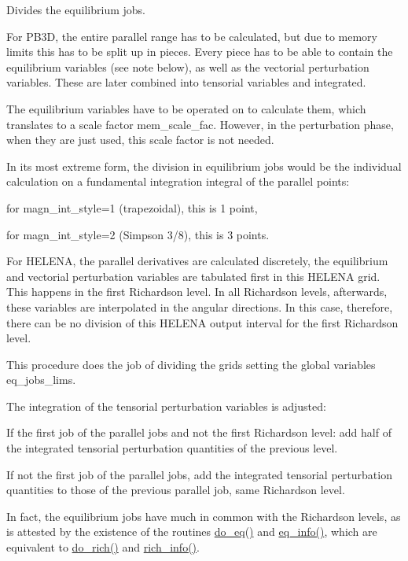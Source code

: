 Divides the equilibrium jobs. 

For P\+B3D, the entire parallel range has to be calculated, but due to memory limits this has to be split up in pieces. Every piece has to be able to contain the equilibrium variables (see note below), as well as the vectorial perturbation variables. These are later combined into tensorial variables and integrated.

The equilibrium variables have to be operated on to calculate them, which translates to a scale factor {\ttfamily mem\+\_\+scale\+\_\+fac}. However, in the perturbation phase, when they are just used, this scale factor is not needed.

In its most extreme form, the division in equilibrium jobs would be the individual calculation on a fundamental integration integral of the parallel points\+:
\begin{DoxyItemize}
\item for {\ttfamily magn\+\_\+int\+\_\+style=1} (trapezoidal), this is 1 point,
\item for {\ttfamily magn\+\_\+int\+\_\+style=2} (Simpson 3/8), this is 3 points.
\end{DoxyItemize}

For H\+E\+L\+E\+NA, the parallel derivatives are calculated discretely, the equilibrium and vectorial perturbation variables are tabulated first in this H\+E\+L\+E\+NA grid. This happens in the first Richardson level. In all Richardson levels, afterwards, these variables are interpolated in the angular directions. In this case, therefore, there can be no division of this H\+E\+L\+E\+NA output interval for the first Richardson level.

This procedure does the job of dividing the grids setting the global variables {\ttfamily eq\+\_\+jobs\+\_\+lims}.

The integration of the tensorial perturbation variables is adjusted\+:
\begin{DoxyItemize}
\item If the first job of the parallel jobs and not the first Richardson level\+: add half of the integrated tensorial perturbation quantities of the previous level.
\item If not the first job of the parallel jobs, add the integrated tensorial perturbation quantities to those of the previous parallel job, same Richardson level.
\end{DoxyItemize}

In fact, the equilibrium jobs have much in common with the Richardson levels, as is attested by the existence of the routines \hyperlink{namespaceeq__utilities_a5109472305101af3a15e8e8717c426fd}{do\+\_\+eq()} and \hyperlink{namespaceeq__utilities_a34c5ddab45a54a6c738e5e0b8c7d55d6}{eq\+\_\+info()}, which are equivalent to \hyperlink{namespacerich__ops_a50f4088b9ddd59597987fb4112f2a73e}{do\+\_\+rich()} and \hyperlink{namespacerich__vars_a4f54d3fc0ac510fc073220794ee4fa37}{rich\+\_\+info()}.


